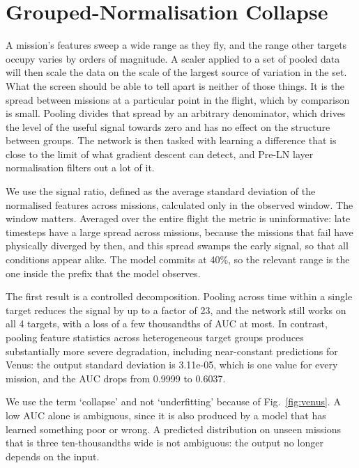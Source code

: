\documentclass[preprint,12pt,authoryear]{elsarticle}
\begin{document}
\section{Grouped-Normalisation Collapse}
\label{sec:collapse}

A mission's features sweep a wide range as they fly, and the range other targets occupy varies by orders of magnitude. A scaler applied to a set of pooled data will then scale the data on the scale of the largest source of variation in the set. What the screen should be able to tell apart is neither of those things. It is the spread between missions at a particular point in the flight, which by comparison is small. Pooling divides that spread by an arbitrary denominator, which drives the level of the useful signal towards zero and has no effect on the structure between groups. The network is then tasked with learning a difference that is close to the limit of what gradient descent can detect, and Pre-LN layer normalisation filters out a lot of it.

We use the signal ratio, defined as the average standard deviation of the normalised features across missions, calculated only in the observed window. The window matters. Averaged over the entire flight the metric is uninformative: late timesteps have a large spread across missions, because the missions that fail have physically diverged by then, and this spread swamps the early signal, so that all conditions appear alike. The model commits at 40\%, so the relevant range is the one inside the prefix that the model observes.

The first result is a controlled decomposition. Pooling across time within a single target reduces the signal by up to a factor of 23, and the network still works on all 4 targets, with a loss of a few thousandths of AUC at most. In contrast, pooling feature statistics across heterogeneous target groups produces substantially more severe degradation, including near-constant predictions for Venus: the output standard deviation is 3.11e-05, which is one value for every mission, and the AUC drops from 0.9999 to 0.6037.

We use the term `collapse' and not `underfitting' because of Fig.~\ref{fig:venus}. A low AUC alone is ambiguous, since it is also produced by a model that has learned something poor or wrong. A predicted distribution on unseen missions that is three ten-thousandths wide is not ambiguous: the output no longer depends on the input.
\end{document}
